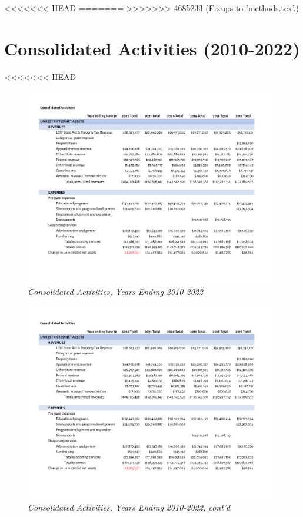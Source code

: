 <<<<<<< HEAD
=======
>>>>>>> 4685233 (Fixups to 'methods.tex'.)

\chapter{Consolidated Activities (2010-2022)}\label{ch:consolidated_activities_2010-22}
<<<<<<< HEAD

\begin{figure}
  \caption[Consolidated Activities, Years Ending 2010–2022]{\textit{Consolidated Activities, Years Ending 2010-2022}}\label{fig:consolidated_activities_2010-2022-4} %
  \includegraphics[page=1,width=0.9\textheight]{Consolidated_Activities_Years_2010-2022} %
\end{figure}

\begin{figure}
  \caption*{\textit{Consolidated Activities, Years Ending 2010-2022, cont'd}} %
  \includegraphics[page=2,width=0.9\textheight]{Consolidated_Activities_Years_2010-2022} %
\end{figure}

